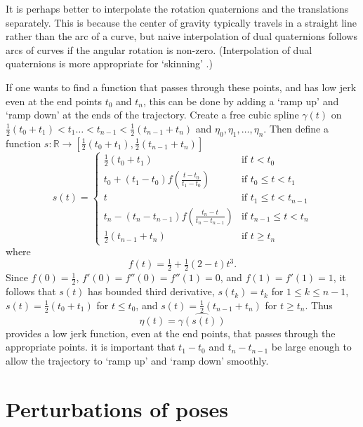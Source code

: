 \documentclass[reqno,12pt]{amsart}
\begin{document}
It is perhaps better to interpolate the rotation quaternions and the translations separately.  This is because the center of gravity typically travels in a straight line rather than the arc of a curve, but naive interpolation of dual quaternions follows arcs of curves if the angular rotation is non-zero.  (Interpolation of dual quaternions is more appropriate for `skinning' \cite{kavan-et-al,kavan-et-al-2}.)

If one wants to find a function that passes through these points, and has low jerk even at the end points $t_0$ and $t_n$, this can be done by adding a `ramp up' and `ramp down' at the ends of the trajectory.  Create a free cubic spline $\gamma(t)$ on $\tfrac12(t_0+t_1)<t_1\dots<t_{n-1}<\tfrac12(t_{n-1}+t_n)$ and $\eta_0, \eta_1, \dots, \eta_n$.  Then define a function $s:\mathbb R \to [\tfrac12(t_0+t_1),\tfrac12(t_{n-1}+t_n)]$
\begin{equation}
s(t) = 
\begin{cases}
\tfrac12(t_0+t_1) & \text{if $t < t_0$} \\
t_0 + (t_1-t_0) f \left(\frac{t-t_0}{t_1-t_0}\right) & \text{if $t_0 \le t < t_1$} \\
t & \text{if $t_1 \le t < t_{n-1}$} \\
t_n - (t_n-t_{n-1}) f \left(\frac{t_n-t}{t_n-t_{n-1}}\right) & \text{if $t_{n-1} \le t < t_n$} \\
\tfrac12(t_{n-1}+t_n) & \text{if $t \ge t_n$}
\end{cases}
\end{equation}
where
\begin{equation}
f(t) = \tfrac12 + \tfrac12 (2-t) t^3 .
\end{equation}
Since $f(0) = \tfrac12$, $f'(0) = f''(0) = f''(1) = 0$, and $f(1) = f'(1) = 1$, it follows that $s(t)$ has bounded third derivative, $s(t_k) = t_k$ for $1 \le k \le n-1$, $s(t) = \tfrac12(t_0+t_1)$ for $t \le t_0$, and $s(t) = \tfrac12(t_{n-1}+t_n)$ for $t \ge t_n$.
Thus
\begin{equation}
\eta(t) = \widehat{\gamma(s(t))}
\end{equation}
provides a low jerk function, even at the end points, that passes through the appropriate points.  it is important that $t_1-t_0$ and $t_n-t_{n-1}$ be large enough to allow the trajectory to `ramp up' and `ramp down' smoothly.

\section{Perturbations of poses}
\end{document}
